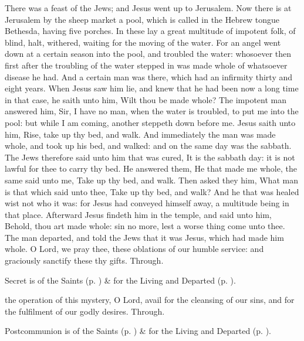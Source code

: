  There was a feast of the Jews; and Jesus went up to Jerusalem. Now there is at Jerusalem by the sheep market a pool, which is called in the Hebrew tongue Bethesda, having five porches. In these lay a great multitude of impotent folk, of blind, halt, withered, waiting for the moving of the water. For an angel went down at a certain season into the pool, and troubled the water: whosoever then first after the troubling of the water stepped in was made whole of whatsoever disease he had. And a certain man was there, which had an infirmity thirty and eight years. When Jesus saw him lie, and knew that he had been now a long time in that case, he saith unto him, Wilt thou be made whole? The impotent man answered him, Sir, I have no man, when the water is troubled, to put me into the pool: but while I am coming, another steppeth down before me. Jesus saith unto him, Rise, take up thy bed, and walk. And immediately the man was made whole, and took up his bed, and walked: and on the same day was the sabbath. The Jews therefore said unto him that was cured, It is the sabbath day: it is not lawful for thee to carry thy bed. He answered them, He that made me whole, the same said unto me, Take up thy bed, and walk. Then asked they him, What man is that which said unto thee, Take up thy bed, and walk? And he that was healed wist not who it was: for Jesus had conveyed himself away, a multitude being in that place. Afterward Jesus findeth him in the temple, and said unto him, Behold, thou art made whole: sin no more, lest a worse thing come unto thee. The man departed, and told the Jews that it was Jesus, which had made him whole.
\secret
{} O Lord, we pray thee, these oblations of our humble service: and graciously sanctify these thy gifts. Through.
\begin{rubric}
     Secret is of the Saints (p. \pageref{SPSaints}) \&  for the Living and Departed (p. \pageref{SPLivingDeparted}).
\end{rubric}
\postcommunion
{} the operation of this mystery, O Lord, avail for the cleansing of our sins, and for the fulfilment of our godly desires. Through.\\
\begin{rubric}
     Postcommunion is of the Saints (p. \pageref{SPSaints}) \&  for the Living and Departed (p. \pageref{SPLivingDeparted}).
\end{rubric}

